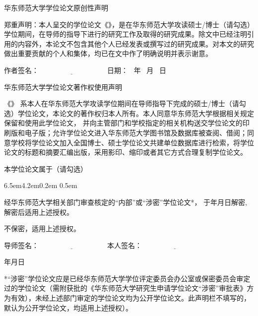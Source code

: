 \newpage
\thispagestyle{empty}

\vspace*{1em}

{
\linespread{1.4}
\centerline{\STSong 华东师范大学学位论文原创性声明}

\bigskip

郑重声明：本人呈交的学位论文《\cctitle》，是在华东师范大学攻读硕士/博士（请勾选）学位期间，在导师的指导下进行的研究工作及取得的研究成果。除文中已经注明引用的内容外，本论文不包含其他个人已经发表或撰写过的研究成果。对本文的研究做出重要贡献的个人和集体，均已在文中作了明确说明并表示谢意。

\vspace{1em}


{\STSong 作者签名}：$\underline{\hspace{4cm}}$ \hfill
{\STSong 日\quad 期}： \qquad\ 年 \quad\ 月 \quad\ 日 \qquad\mbox{}

\vspace{4em}

\centerline{\STSong 华东师范大学学位论文著作权使用声明}
\bigskip


《\cctitle》
系本人在华东师范大学攻读学位期间在导师指导下完成的硕士/博士（请勾选）学位论文，本论文的著作权归本人所有。本人同意华东师范大学根据相关规定保留和使用此学位论文，
并向主管部门和学校指定的相关机构送交学位论文的印刷版和电子版；允许学位论文进入华东师范大学图书馆及数据库被查阅、借阅；同意学校将学位论文加入全国博士、硕士学位论文共建单位数据库进行检索，将学位论文的标题和摘要汇编出版，采用影印、缩印或者其它方式合理复制学位论文。

本学位论文属于（请勾选）
\begin{list}{{\hfill\upshape (\qquad)\ . }}{%
     \leftmargin6.5em4.2em0.2em
     \itemsep0.5em}

\item 经华东师范大学相关部门审查核定的“内部”或“涉密”学位论文*，
  于\makebox[1cm][c]{}年\makebox[1cm][c]{}月\makebox[1cm][c]{}日解密, 解密后适用上述授权。

\item 不保密，适用上述授权。
\end{list}

\vskip0.8cm


{\STSong 导师签名}：$\underline{\hspace{4cm}}$ \hfill
{\STSong 本人签名}：$\underline{\hspace{4cm}}$

\bigskip

{\hfill\makebox[1cm][c]{}年\makebox[1cm][c]{}月\makebox[1cm][c]{}日}

\vfill

\parbox[t]{0.946\textwidth}{
*“涉密”学位论文应是已经华东师范大学学位评定委员会办公室或保密委员会审定过的学位论文（需附获批的《华东师范大学研究生申请学位论文“涉密”审批表》方为有效），未经上述部门审定的学位论文均为公开学位论文。此声明栏不填写的，默认为公开学位论文，均适用上述授权）。
}
}
